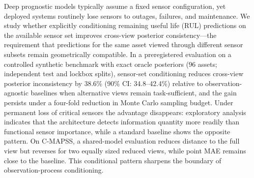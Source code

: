 
Deep prognostic models typically assume a fixed sensor configuration, yet deployed systems routinely lose sensors to outages, failures, and maintenance. We study whether explicitly conditioning remaining useful life (RUL) predictions on the available sensor set improves cross-view posterior consistency---the requirement that predictions for the same asset viewed through different sensor subsets remain geometrically compatible. In a preregistered evaluation on a controlled synthetic benchmark with exact oracle posteriors (96 assets; independent test and lockbox splits), sensor-set conditioning reduces cross-view posterior inconsistency by 38.6\% (90\% CI: 34.8--42.4\%) relative to observation-agnostic baselines when alternative views remain task-sufficient, and the gain persists under a four-fold reduction in Monte Carlo sampling budget. Under permanent loss of critical sensors the advantage disappears: exploratory analysis indicates that the architecture detects information quantity more readily than functional sensor importance, while a standard baseline shows the opposite pattern. On C-MAPSS, a shared-model evaluation reduces distance to the full view but reverses for two equally sized reduced views, while point MAE remains close to the baseline. This conditional pattern sharpens the boundary of observation-process conditioning.
